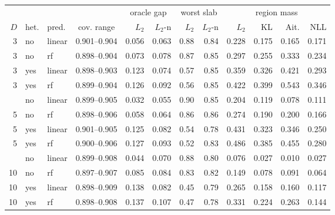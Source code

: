 \begin{tabular}{rllcrrrrrrrr}
\toprule
 & & & & \multicolumn{2}{c}{oracle gap} & \multicolumn{2}{c}{worst slab} & \multicolumn{4}{c}{region mass} \\
\cmidrule(lr){5-6} \cmidrule(lr){7-8} \cmidrule(lr){9-12}
$D$ & het. & pred. & cov. range & $L_2$ & $L_2$-n & $L_2$ & $L_2$-n & $L_2$ & KL & Ait. & NLL \\
\midrule
3 & no & linear & 0.901--0.904 & 0.056 & 0.063 & 0.88 & 0.84 & 0.228 & 0.175 & 0.165 & 0.171 \\
3 & no & rf & 0.898--0.904 & 0.073 & 0.078 & 0.87 & 0.85 & 0.297 & 0.255 & 0.333 & 0.234 \\
3 & yes & linear & 0.898--0.903 & 0.123 & 0.074 & 0.57 & 0.85 & 0.359 & 0.326 & 0.421 & 0.293 \\
3 & yes & rf & 0.899--0.904 & 0.126 & 0.092 & 0.56 & 0.85 & 0.422 & 0.399 & 0.543 & 0.346 \\
\addlinespace
5 & no & linear & 0.899--0.905 & 0.032 & 0.055 & 0.90 & 0.85 & 0.204 & 0.119 & 0.078 & 0.111 \\
5 & no & rf & 0.898--0.906 & 0.058 & 0.064 & 0.86 & 0.86 & 0.274 & 0.190 & 0.200 & 0.166 \\
5 & yes & linear & 0.901--0.905 & 0.125 & 0.082 & 0.54 & 0.78 & 0.431 & 0.323 & 0.346 & 0.250 \\
5 & yes & rf & 0.900--0.906 & 0.127 & 0.093 & 0.52 & 0.83 & 0.486 & 0.385 & 0.455 & 0.280 \\
\addlinespace
10 & no & linear & 0.899--0.908 & 0.044 & 0.070 & 0.88 & 0.80 & 0.076 & 0.027 & 0.010 & 0.027 \\
10 & no & rf & 0.897--0.907 & 0.085 & 0.084 & 0.83 & 0.82 & 0.149 & 0.078 & 0.091 & 0.064 \\
10 & yes & linear & 0.898--0.909 & 0.138 & 0.082 & 0.45 & 0.79 & 0.265 & 0.158 & 0.160 & 0.117 \\
10 & yes & rf & 0.898--0.908 & 0.137 & 0.107 & 0.47 & 0.78 & 0.331 & 0.224 & 0.263 & 0.144 \\
\bottomrule
\end{tabular}
